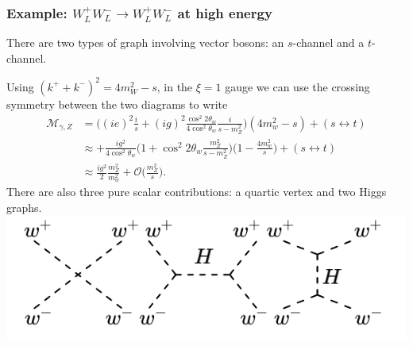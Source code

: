 \subsubsection{Example: $W_L^+W_L^- \to W_L^+W_L^-$ at high energy}
%
There are two types of graph involving vector bosons: an $s$-channel and a $t$-channel.
\begin{figure}[!h]
  \centering
  \hfill
\end{figure}
Using $(k^+ + k^-)^2 = 4 m_W^2 -s$, in the $\xi = 1$ gauge we can use the crossing symmetry between the two diagrams to write
\begin{equation}
\begin{split}
\mathcal{M}_{\gamma,Z} &= \bigg( (ie)^2 \frac{i}{s} + (ig)^2 \frac{\cos^2 2\theta_w}{4 \cos^2\theta_w} \frac{i}{s-m_Z^2}\bigg)(4m_w^2-s) + (s \leftrightarrow t) \\
&\approx +\frac{ig^2}{4 \cos^2 \theta_w}\bigg(1 + \cos^2 2\theta_w\frac{m_Z^2}{s-m_Z^2}\bigg)\bigg(1- \frac{4m_w^2}{s}\bigg) + (s \leftrightarrow t) \\
&\approx \frac{ig^2}{2}\frac{m_Z^2}{m_w^2} + \mathcal{O}\bigg(\frac{m_Z^2}{s}\bigg).
\end{split}
\end{equation} 
There are also three pure scalar contributions: a quartic vertex and two Higgs graphs.
\newline
\includegraphics[width=\linewidth]{figs/38d.png}
